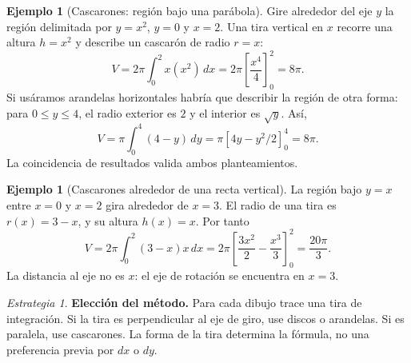 \documentclass[12pt]{article}
\theoremstyle{definition}
\newtheorem{ejemplo}[teorema]{Ejemplo}
\theoremstyle{remark}
\newtheorem*{estrategia}{Estrategia}
\newcommand{\dd}{\,dx}
\begin{document}
\begin{ejemplo}[Cascarones: región bajo una parábola]
Gire alrededor del eje $y$ la región delimitada por $y=x^2$, $y=0$ y $x=2$. Una tira vertical en $x$ recorre una altura $h=x^2$ y describe un cascarón de radio $r=x$:
\[V=2\pi\int_0^2 x(x^2)\dd
=2\pi\left[\frac{x^4}{4}\right]_0^2
=\boxed{8\pi}.\]
Si usáramos arandelas horizontales habría que describir la región de otra forma: para $0\le y\le4$, el radio exterior es $2$ y el interior es $\sqrt y$. Así,
\[V=\pi\int_0^4(4-y)\,dy
=\pi[4y-y^2/2]_0^4=8\pi.\]
La coincidencia de resultados valida ambos planteamientos.
\end{ejemplo}
\begin{ejemplo}[Cascarones alrededor de una recta vertical]
La región bajo $y=x$ entre $x=0$ y $x=2$ gira alrededor de $x=3$. El radio de una tira es $r(x)=3-x$, y su altura $h(x)=x$. Por tanto
\[V=2\pi\int_0^2(3-x)x\dd
=2\pi\left[\frac{3x^2}{2}-\frac{x^3}{3}\right]_0^2
=\boxed{\frac{20\pi}{3}}.\]
La distancia al eje no es $x$: el eje de rotación se encuentra en $x=3$.
\end{ejemplo}
\begin{estrategia}
\textbf{Elección del método.} Para cada dibujo trace una tira de integración. Si la tira es perpendicular al eje de giro, use discos o arandelas. Si es paralela, use cascarones. La forma de la tira determina la fórmula, no una preferencia previa por $dx$ o $dy$.
\end{estrategia}

\end{document}

